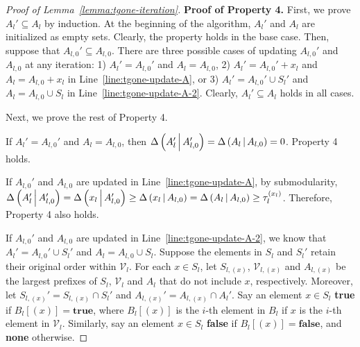 \begin{proof}[Proof of Lemma~\ref{lemma:tgone-iteration}]
\textbf{Proof of Property 4.}
First, we prove $A_l'\subseteq A_l$ by induction.
At the beginning of the algorithm,
$A_l'$ and $A_l$ are initialized as empty sets.
Clearly, the property holds in the base case.
Then, suppose that $A_{l,0}'\subseteq A_{l,0}$.
There are three possible cases of updating $A_{l,0}'$ and $A_{l,0}$ at any iteration:
1) $A_l'=A_{l,0}'$ and $A_l = A_{l,0}$,
2) $A_l' = A_{l,0}' + x_l$ and $A_l = A_{l,0} + x_l$ in Line~\ref{line:tgone-update-A},
or 3) $A_l' = A_{l,0}' \cup S_l'$ and $A_l = A_{l,0} \cup S_l$ in Line~\ref{line:tgone-update-A-2}.
Clearly, $A_l'\subseteq A_l$ holds in all cases.

Next, we prove the rest of Property 4.

If $A_l'=A_{l,0}'$ and $A_l = A_{l,0}$, 
then $\Delta \left( A_l' \, \middle| \, A_{l, 0}' \right) = \Delta \left( A_l \, \middle| \, A_{l, 0} \right)=0$.
Property 4 holds.

If $A_{l,0}'$ and $A_{l,0}$ are updated in Line~\ref{line:tgone-update-A},
by submodularity, $\Delta \left( A_l' \, \middle| \, A_{l, 0}' \right) = \Delta \left( x_l \, \middle| \, A_{l, 0}' \right) \ge \Delta \left( x_l \, \middle| \, A_{l, 0} \right)=\Delta \left( A_l \, \middle| \, A_{l, 0} \right) \ge \tau_l^{(x_{l})}$.
Therefore, Property 4 also holds.

If $A_{l,0}'$ and $A_{l,0}$ are updated in Line~\ref{line:tgone-update-A-2},
we know that $A_l' = A_{l,0}' \cup S_l'$ and $A_l = A_{l,0} \cup S_l$.
Suppose the elements in $S_l$ and $S_l'$ retain their original order within $\mathcal V_l$.
For each $x\in S_l$, let $S_{l,(x)}$, $\mathcal V_{l, (x)}$ and $A_{l, (x)}$
be the largest prefixes of $S_l$, $\mathcal V_l$ and $A_l$ that do not include $x$, respectively.
Moreover, let $S_{l, (x)}' = S_{l, (x)}\cap S_l'$ and $A_{l, (x)}' = A_{l, (x)}\cap A_l'$.
Say an element $x\in S_l$ \textbf{true} if $B_l[(x)] = \textbf{true}$,
where $B_l[(x)]$ is the $i$-th element in $B_l$ if $x$ is the $i$-th element in $\mathcal V_l$.
Similarly, say an element $x\in S_l$ \textbf{false} if $B_l[(x)] = \textbf{false}$,
and \textbf{none} otherwise.


\end{proof}
